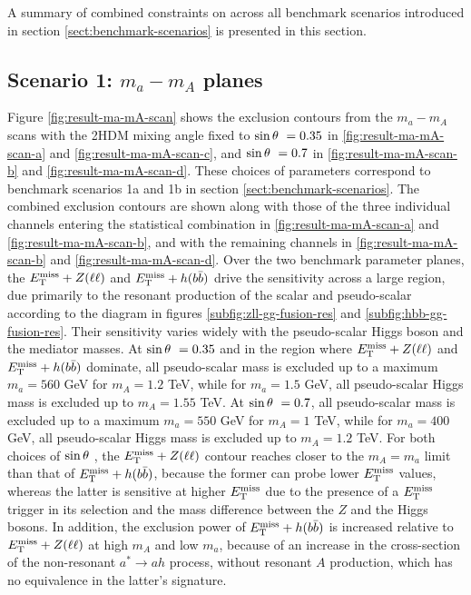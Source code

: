 A summary of combined constraints on \thdma across all benchmark scenarios introduced in section \ref{sect:benchmark-scenarios} is presented in this section. 

\subsection{Scenario 1: \texorpdfstring{$m_a-m_A$}{TEXT} planes}
Figure \ref{fig:result-ma-mA-scan} shows the exclusion contours from the $m_a-m_A$ scans with the 2HDM mixing angle fixed to $\sin\theta~=0.35$ in \ref{fig:result-ma-mA-scan-a} and \ref{fig:result-ma-mA-scan-c}, and $\sin\theta~=0.7$ in \ref{fig:result-ma-mA-scan-b} and \ref{fig:result-ma-mA-scan-d}. These choices of parameters correspond to benchmark scenarios 1a and 1b in section \ref{sect:benchmark-scenarios}. The combined exclusion contours are shown along with those of the three individual channels entering the statistical combination in \ref{fig:result-ma-mA-scan-a} and \ref{fig:result-ma-mA-scan-b}, and with the remaining channels in \ref{fig:result-ma-mA-scan-b} and \ref{fig:result-ma-mA-scan-d}. Over the two benchmark parameter planes, the $E_{\mathrm{T}}^{\mathrm{miss}}+Z(\ell\ell)$ and $E_{\mathrm{T}}^{\mathrm{miss}}+h(b\bar{b})$ drive the sensitivity across a large region, due primarily to the resonant production of the scalar and pseudo-scalar according to the diagram in figures \ref{subfig:zll-gg-fusion-res} and \ref{subfig:hbb-gg-fusion-res}. Their sensitivity varies widely with the pseudo-scalar Higgs boson and the mediator masses. At $\sin\theta~=0.35$ and in the region where $E_{\mathrm{T}}^{\mathrm{miss}}+Z(\ell\ell)$ and $E_{\mathrm{T}}^{\mathrm{miss}}+h(b\bar{b})$ dominate, all pseudo-scalar mass is excluded up to a maximum $m_a=560$ GeV for $m_A=1.2$ TeV, while for $m_a=1.5$ GeV, all pseudo-scalar Higgs mass is excluded up to $m_A=1.55$ TeV. At $\sin\theta~=0.7$, all pseudo-scalar mass is excluded up to a maximum $m_a=550$ GeV for $m_A=1$ TeV, while for $m_a=400$ GeV, all pseudo-scalar Higgs mass is excluded up to $m_A=1.2$ TeV. For both choices of $\sin\theta~$, the $E_{\mathrm{T}}^{\mathrm{miss}}+Z(\ell\ell)$ contour reaches closer to the $m_A=m_a$ limit than that of $E_{\mathrm{T}}^{\mathrm{miss}}+h(b\bar{b})$, because the former can probe lower $E_{\mathrm{T}}^{\mathrm{miss}}$ values, whereas the latter is sensitive at higher $E_{\mathrm{T}}^{\mathrm{miss}}$ due to the presence of a $E_{\mathrm{T}}^{\mathrm{miss}}$ trigger in its selection and the mass difference between the $Z$ and the Higgs bosons. In addition, the exclusion power of $E_{\mathrm{T}}^{\mathrm{miss}}+h(b\bar{b})$ is increased relative to $E_{\mathrm{T}}^{\mathrm{miss}}+Z(\ell\ell)$ at high $m_A$ and low $m_a$, because of an increase in the cross-section of the non-resonant $a^*\rightarrow ah$ process, without resonant $A$ production, which has no equivalence in the latter's signature.

